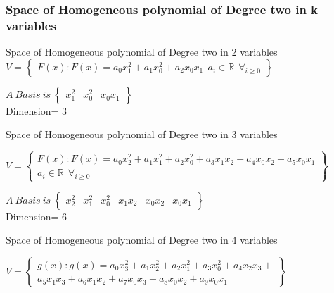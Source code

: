 \documentclass{beamer}
\newenvironment{changemargin}[2]{%
  \begin{list}{}{%
    \setlength{\topsep}{0pt}%
    \setlength{\leftmargin}{#1}%
    \setlength{\rightmargin}{#2}%
    \setlength{\listparindent}{\parindent}%
    \setlength{\itemindent}{\parindent}%
    \setlength{\parsep}{\parskip}%
  }%
  \item[]}{\end{list}}
\begin{document}
\begin{frame}
\frametitle{Space of Homogeneous polynomial of Degree two in k variables}
\begin{block}{}
\begin{itemize}

\item Space of Homogeneous polynomial of Degree two in 2 variables\\
\newcommand\fontsizex{\fontsize{10pt}{10pt}\selectfont}
{\fontsizex$V=\begin{Bmatrix}
F(x):F(x)=a_{0}x_{1}^{2}+ a_{1}x_{0}^{2}+a_{2}x_{0}x_{1} ~~a_i \in \mathbb{R}~~\forall_{i\geq 0}
\end{Bmatrix}$}

$A~Basis ~is~\begin{Bmatrix} x_{1}^{2}& x_{0}^{2}& x_{0}x_{1} \end{Bmatrix}$\\
Dimension= 3 
\item Space of Homogeneous polynomial of Degree two in 3 variables\\
\newcommand\fontsizeix{\fontsize{8pt}{9pt}\selectfont}

{\fontsizeix $V=\begin{Bmatrix}
F(x):F(x)=a_{0}x_{2}^{2}+a_{1}x_{1}^{2}+a_{2}x_{0}^{2}+a_{3}x_{1}x_{2}+a_{4}x_{0}x_{2}+a_{5}x_{0}x_{1} \\a_i \in \mathbb{R}~~\forall_{i\geq 0}
\end{Bmatrix}$}

$A~ Basis ~is~\begin{Bmatrix} x_{2}^{2}& x_{1}^{2}& x_{0}^{2}& x_{1}x_{2}& x_{0}x_{2}& x_{0}x_{1} \end{Bmatrix}$\\
Dimension= 6 
\item Space of Homogeneous polynomial of Degree two in 4 variables\\

\begin{changemargin}{0pt}{0pt}
$V=\begin{Bmatrix}
g(x):g(x)=a_{0}x_{3}^{2}+a_{1}x_{2}^{2}+a_{2}x_{1}^{2}+a_{3}x_{0}^{2}+a_{4}x_{2}x_{3}+\\a_{5}x_{1}x_{3}+a_{6}x_{1}x_{2}+a_{7}x_{0}x_{3}+a_{8}x_{0}x_{2}+a_{9}x_{0}x_{1} 
\end{Bmatrix}$
\end{changemargin}

\end{itemize}
\end{block}
\end{frame}
\end{document}
